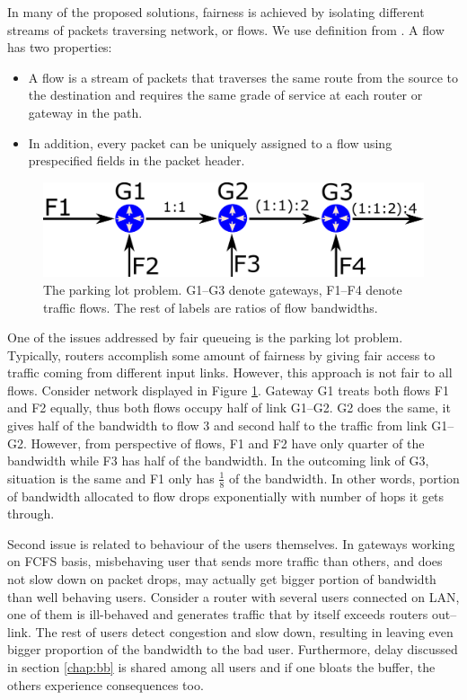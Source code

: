 In many of the proposed solutions, fairness is achieved by isolating different streams of packets traversing network, or flows. We use definition from \cite{Zhang:1990:VCN:99517.99525}. A flow has two properties:
\begin{itemize}
	\item A flow is a stream of packets that traverses the same route from the source to the destination and requires the same grade of service at each router or gateway in the path.
	\item In addition, every packet can be uniquely assigned to a flow using prespecified fields in the packet header.
\end{itemize}
 
\begin{figure}
	\centering
	\includegraphics[width=137mm]{drawings/parking_lot}
	\caption{The parking lot problem. G1--G3 denote gateways, F1--F4 denote traffic flows. The rest of labels are ratios of flow bandwidths.}
	
	\label{fig05:ParkingLot}
\end{figure}

One of the issues addressed by fair queueing is the parking lot problem. Typically, routers accomplish some amount of fairness by giving fair access to traffic coming from different input links. However, this approach is not fair to all flows. Consider network displayed in Figure \ref{fig05:ParkingLot}. Gateway G1 treats both flows F1 and F2 equally, thus both flows occupy half of link G1--G2. G2 does the same, it gives half of the bandwidth to flow 3 and second half to the traffic from link G1--G2. However, from perspective of flows, F1 and F2 have only quarter of the bandwidth while F3 has half of the bandwidth. In the outcoming link of G3, situation is the same and F1 only has $\frac{1}{8}$ of the bandwidth. In other words, portion of bandwidth allocated to flow drops exponentially with number of hops it gets through.

Second issue is related to behaviour of the users themselves. In gateways working on FCFS basis, misbehaving user that sends more traffic than others, and does not slow down on packet drops, may actually get bigger portion of bandwidth than well behaving users. Consider a router with several users connected on LAN, one of them is ill-behaved and generates traffic that by itself exceeds routers out--link. The rest of users detect congestion and slow down, resulting in leaving even bigger proportion of the bandwidth to the bad user. Furthermore, delay discussed in section \ref{chap:bb} is shared among all users and if one bloats the buffer, the others experience consequences too.

